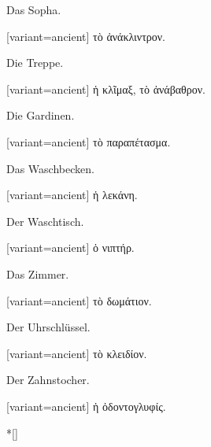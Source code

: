 Das Sopha.

\switchcolumn

\begin{greek}[variant=ancient]%
τὸ ἀνάκλιντρον.

\end{greek}%
\switchcolumn*

Die Treppe.

\switchcolumn

\begin{greek}[variant=ancient]%
ἡ κλῖμαξ, τὸ ἀνάβαθρον.

\end{greek}%
\switchcolumn*

Die Gardinen.

\switchcolumn

\begin{greek}[variant=ancient]%
τὸ παραπέτασμα.

\end{greek}%
\switchcolumn*

Das Waschbecken.

\switchcolumn

\begin{greek}[variant=ancient]%
ἡ λεκάνη.

\end{greek}%
\switchcolumn*

Der Waschtisch.

\switchcolumn

\begin{greek}[variant=ancient]%
ὁ νιπτήρ.

\end{greek}%
\switchcolumn*

Das Zimmer.

\switchcolumn

\begin{greek}[variant=ancient]%
τὸ δωμάτιον.

\end{greek}%
\switchcolumn*

Der Uhrschlüssel.

\switchcolumn

\begin{greek}[variant=ancient]%
τὸ κλειδίον.

\end{greek}%
\switchcolumn*

Der Zahnstocher. 

\switchcolumn

\begin{greek}[variant=ancient]%
ἡ ὀδοντογλυφίς.

\end{greek}%
\switchcolumn[0]*[\StarOrnament]

